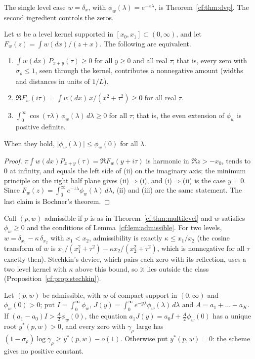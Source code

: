 The single level case $w=\delta_x$, with $\phi_w(\lambda)=e^{-x\lambda}$, is Theorem~\ref{cf:thm:dvp}. The second ingredient controls the zeros.

\begin{lemma}\label{cf:lem:admissible}
Let $w$ be a level kernel supported in $[x_0,x_1]\subset(0,\infty)$, and let $F_w(z)=\int w(dx)/(z+x)$. The following are equivalent.
\begin{enumerate}
\item[(i)] $\int w(dx)\,P_{x+y}(\tau)\ge0$ for all $y\ge0$ and all real $\tau$; that is, every zero with $\sigma_\rho\le1$, seen through the kernel, contributes a nonnegative amount (widths and distances in units of $1/L$).
\item[(ii)] $\Re F_w(i\tau)=\int w(dx)\,x/(x^2+\tau^2)\ge0$ for all real $\tau$.
\item[(iii)] $\int_0^\infty\cos(\tau\lambda)\,\phi_w(\lambda)\,d\lambda\ge0$ for all $\tau$; that is, the even extension of $\phi_w$ is positive definite.
\end{enumerate}
When they hold, $\lvert\phi_w(\lambda)\rvert\le\phi_w(0)$ for all $\lambda$.
\end{lemma}

\begin{proof}
$\pi\int w(dx)P_{x+y}(\tau)=\Re F_w(y+i\tau)$ is harmonic in $\Re z>-x_0$, tends to $0$ at infinity, and equals the left side of (ii) on the imaginary axis; the minimum principle on the right half plane gives (ii)$\Rightarrow$(i), and (i)$\Rightarrow$(ii) is the case $y=0$. Since $F_w(z)=\int_0^\infty e^{-z\lambda}\phi_w(\lambda)\,d\lambda$, (ii) and (iii) are the same statement. The last claim is Bochner's theorem.
\end{proof}

Call $(p,w)$ admissible if $p$ is as in Theorem~\ref{cf:thm:multilevel} and $w$ satisfies $\phi_w\ge0$ and the conditions of Lemma~\ref{cf:lem:admissible}. For two levels, $w=\delta_{x_1}-\kappa\,\delta_{x_2}$ with $x_1<x_2$, admissibility is exactly $\kappa\le x_1/x_2$ (the cosine transform of $w$ is $x_1/(x_1^2+\tau^2)-\kappa x_2/(x_2^2+\tau^2)$, which is nonnegative for all $\tau$ exactly then). Stechkin's device, which pairs each zero with its reflection, uses a two level kernel with $\kappa$ above this bound, so it lies outside the class (Proposition~\ref{cf:prop:stechkin}).

\begin{corollary}\label{cf:cor:ystar}
Let $(p,w)$ be admissible, with $w$ of compact support in $(0,\infty)$ and $\phi_w(0)>0$; put $I=\int_0^\infty\phi_w$, $J(y)=\int_0^\infty e^{-y\lambda}\phi_w(\lambda)\,d\lambda$ and $A=a_1+\dots+a_K$. If $(a_1-a_0)I>\frac A2\phi_w(0)$, the equation $a_1J(y)=a_0I+\frac A2\phi_w(0)$ has a unique root $y^\ast(p,w)>0$, and every zero with $\gamma_\rho$ large has $(1-\sigma_\rho)\log\gamma_\rho\ge y^\ast(p,w)-o(1)$. Otherwise put $y^\ast(p,w)=0$: the scheme gives no positive constant.
\end{corollary}

